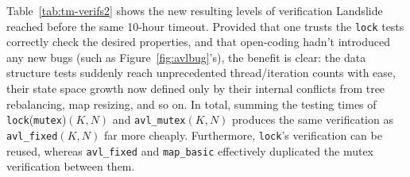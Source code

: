 Table~\ref{tab:tm-verifs2} shows the new resulting levels of verification
Landslide reached before the same 10-hour timeout.
Provided that one trusts the {\tt lock} tests correctly check the desired properties,
and that open-coding hadn't introduced any new bugs (such as Figure~\ref{fig:avlbug}'s),
the benefit is clear:
the data structure tests suddenly reach unprecedented thread/iteration counts with ease,
their state space growth now defined only by their internal conflicts from tree rebalancing, map resizing, and so on.
In total,
summing the testing times of {\tt lock}({\tt mutex})$(K,N)$ and {\tt avl\_mutex}$(K,N)$
produces the same verification as {\tt avl\_fixed}$(K,N)$ far more cheaply.
Furthermore, {\tt lock}'s verification can be reused,
whereas {\tt avl\_fixed} and {\tt map\_basic} effectively duplicated the mutex verification between them.

